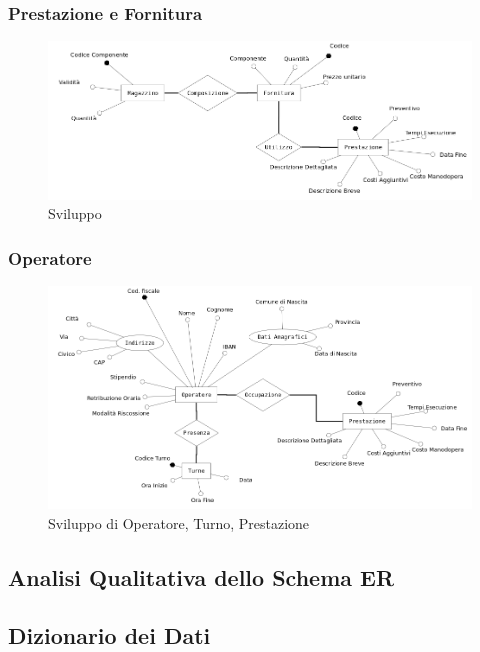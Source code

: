 		\subsubsection{Prestazione e Fornitura}
			
			\begin{figure}[H]
				\centering
				\includegraphics[width=11.5cm]{images/finitures/prestazione_fornitura.png}
				\caption{Sviluppo}
				\label{fig:ordine_fornitore}
			\end{figure}
		
		\subsubsection{Operatore}
		
			\begin{figure}[H]
				\centering
				\includegraphics[width=11.5cm]{images/finitures/operatore_turno_prestazione.png}
				\caption{Sviluppo di Operatore, Turno, Prestazione}
				\label{fig:operatore_turno_prestazione}
			\end{figure}
			

	\subsection{Analisi Qualitativa dello Schema ER}
	
	\subsection{Dizionario dei Dati}
	\label{sec:data_dict}
		
